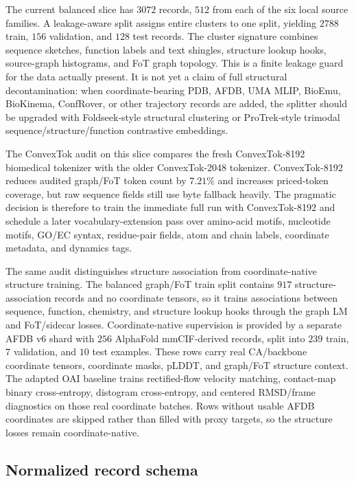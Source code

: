 \documentclass[11pt]{article}
\theoremstyle{definition}
\theoremstyle{plain}
\theoremstyle{remark}
\numberwithin{equation}{section}
\begin{document}
The current balanced slice has $3072$ records, $512$ from each of the six local
source families.  A leakage-aware split assigns entire clusters to one split,
yielding $2788$ train, $156$ validation, and $128$ test records.  The cluster
signature combines sequence sketches, function labels and text shingles,
structure lookup hooks, source-graph histograms, and FoT graph topology.  This
is a finite leakage guard for the data actually present.  It is not yet a claim
of full structural decontamination: when coordinate-bearing PDB, AFDB, UMA
MLIP, BioEmu, BioKinema, ConfRover, or other trajectory records are added, the
splitter should be upgraded with Foldseek-style structural clustering or
ProTrek-style trimodal sequence/structure/function contrastive embeddings.

The ConvexTok audit on this slice compares the fresh ConvexTok-8192
biomedical tokenizer with the older ConvexTok-2048 tokenizer.  ConvexTok-8192
reduces audited graph/FoT token count by $7.21\%$ and increases priced-token
coverage, but raw sequence fields still use byte fallback heavily.  The
pragmatic decision is therefore to train the immediate full run with
ConvexTok-8192 and schedule a later vocabulary-extension pass over amino-acid
motifs, nucleotide motifs, GO/EC syntax, residue-pair fields, atom and chain
labels, coordinate metadata, and dynamics tags.

The same audit distinguishes structure association from coordinate-native
structure training.  The balanced graph/FoT train split contains $917$
structure-association records and no coordinate tensors, so it trains
associations between sequence, function, chemistry, and structure lookup hooks
through the graph LM and FoT/sidecar losses.  Coordinate-native supervision is
provided by a separate AFDB v6 shard with $256$ AlphaFold mmCIF-derived
records, split into $239$ train, $7$ validation, and $10$ test examples.  These
rows carry real CA/backbone coordinate tensors, coordinate masks, pLDDT, and
graph/FoT structure context.  The adapted OAI baseline trains rectified-flow
velocity matching, contact-map binary cross-entropy, distogram cross-entropy,
and centered RMSD/frame diagnostics on those real coordinate batches.  Rows
without usable AFDB coordinates are skipped rather than filled with proxy
targets, so the structure losses remain coordinate-native.

\subsection{Normalized record schema}
\end{document}
